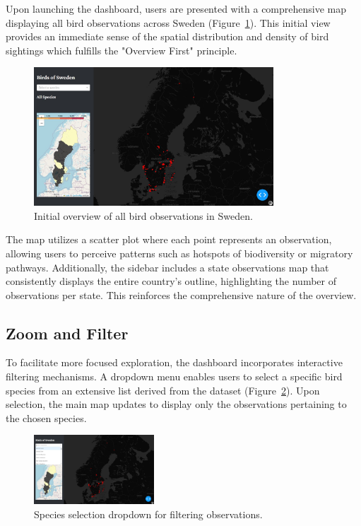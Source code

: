 Upon launching the dashboard, users are presented with a comprehensive map displaying all bird observations across Sweden (Figure~\ref{fig:overview}). This initial view provides an immediate sense of the spatial distribution and density of bird sightings which fulfills the "Overview First" principle.

\begin{figure}[h] 
    \centering 
    \includegraphics[width=0.8\textwidth]{figures/overview_map.jpg} 
    \caption{Initial overview of all bird observations in Sweden.} 
    \label{fig:overview} 
\end{figure}

The map utilizes a scatter plot where each point represents an observation, allowing users to perceive patterns such as hotspots of biodiversity or migratory pathways. Additionally, the sidebar includes a state observations map that consistently displays the entire country's outline, highlighting the number of observations per state. This reinforces the comprehensive nature of the overview.

\subsection{Zoom and Filter}

To facilitate more focused exploration, the dashboard incorporates interactive filtering mechanisms. A dropdown menu enables users to select a specific bird species from an extensive list derived from the dataset (Figure~\ref{fig:dropdown}). Upon selection, the main map updates to display only the observations pertaining to the chosen species.

\begin{figure}[h] 
    \centering 
    \includegraphics[width=0.4\textwidth]{figures/species_dropdown.jpg} 
    \caption{Species selection dropdown for filtering observations.} 
    \label{fig:dropdown} 
\end{figure}

